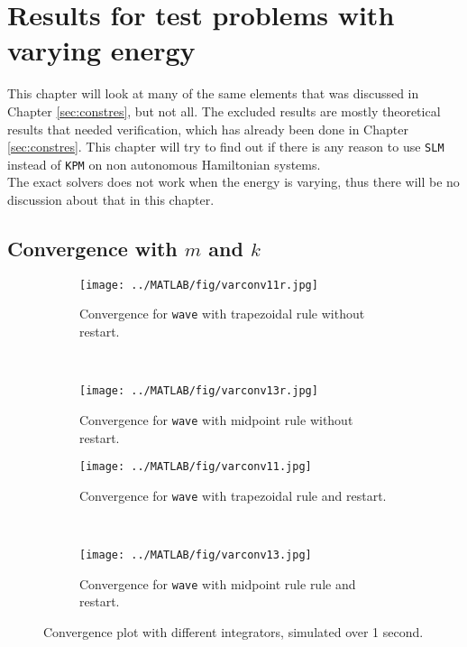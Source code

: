 \chapter{Results for test problems with varying energy}%
\label{sec:varyener} %
This chapter will look at many of the same elements that was discussed in Chapter \ref{sec:constres}, but not all. The excluded results are mostly theoretical results that needed verification, which has already been done in Chapter \ref{sec:constres}. This chapter will try to find out if there is any reason to use \texttt{SLM} instead of \texttt{KPM} on non autonomous Hamiltonian systems. \\
The exact solvers does not work when the energy is varying, thus there will be no discussion about that in this chapter.
\section{Convergence with $m$ and $k$} %
\label{sec:vconv}
\begin{figure}[H]
        \centering
		\begin{subfigure}[b]{0.3\textwidth}
                \texttt{[image: ../MATLAB/fig/varconv11r.jpg]}
                \caption{ Convergence for \texttt{wave} with trapezoidal rule without restart. }
                \label{fig:varconv11r}
        \end{subfigure}%
        ~
        \begin{subfigure}[b]{0.3\textwidth}
                \texttt{[image: ../MATLAB/fig/varconv13r.jpg]}
                \caption{ Convergence for \texttt{wave} with midpoint rule without restart. }
                \label{fig:varconv13r}
        \end{subfigure}
        \begin{subfigure}[b]{0.3\textwidth}
                \texttt{[image: ../MATLAB/fig/varconv11.jpg]}
                \caption{ Convergence for \texttt{wave} with trapezoidal rule and restart. }
                \label{fig:varconv11}
        \end{subfigure}%
        ~
        \begin{subfigure}[b]{0.3\textwidth}
                \texttt{[image: ../MATLAB/fig/varconv13.jpg]}
                \caption{ Convergence for \texttt{wave} with midpoint rule rule and restart. }
                \label{fig:varconv13}
        \end{subfigure}

        \caption{ Convergence plot with different integrators, simulated over 1 second. }
        \label{fig:varconv}
\end{figure}

